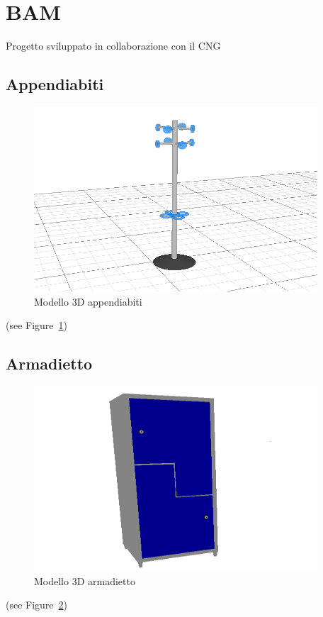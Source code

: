 \section{BAM}
Progetto sviluppato in collaborazione con il CNG

\label{sec:chapter_4_section_1}
\subsection*{Appendiabiti}
\begin{figure}[htbp] %
   \centering
   \includegraphics[width=0.5\linewidth]{images/hanger}
   \caption{Modello 3D appendiabiti}
   \label{fig:appendiabiti}
\end{figure}
(see Figure~\ref{fig:appendiabiti})
\newpage

\subsection*{Armadietto}
\begin{figure}[htbp] %
   \centering
   \includegraphics[width=0.5\linewidth]{images/wardrobe}
   \caption{Modello 3D armadietto}
   \label{fig:armadietto}
   \end{figure}
   (see Figure~\ref{fig:armadietto})
\newpage

